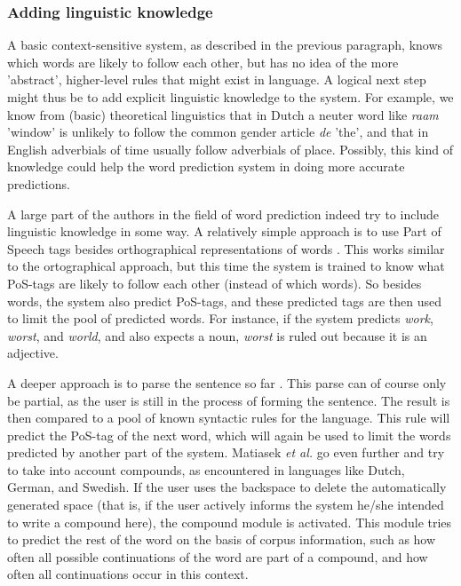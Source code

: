 \documentclass[11pt]{article}
\begin{document}
\subsubsection{Adding linguistic knowledge} \label{linguistic_knowledge}
A basic context-sensitive system, as described in the previous paragraph, knows which words are likely to follow each other, but has no idea of the more 'abstract', higher-level rules that might exist in language. A logical next step might thus be to add explicit linguistic knowledge to the system. For example, we know from (basic) theoretical linguistics that in Dutch a neuter word like \emph{raam} 'window' is unlikely to follow the common gender article \emph{de} 'the', and that in English adverbials of time usually follow adverbials of place. Possibly, this kind of knowledge could help the word prediction system in doing more accurate predictions.

A large part of the authors in the field of word prediction indeed try to include linguistic knowledge in some way. A relatively simple approach is to use Part of Speech tags besides orthographical representations of words \cite{carlberger+97,Fazly+03,copestake97}. This works similar to the ortographical approach, but this time the system is trained to know what PoS-tags are likely to follow each other (instead of which words). So besides words, the system also predict PoS-tags, and these predicted tags are then used to limit the pool of predicted words. For instance, if the system predicts \emph{work}, \emph{worst}, and \emph{world}, and also expects a noun, \emph{worst} is ruled out because it is an adjective.

A deeper approach is to parse the sentence so far \cite{Matiasek+02,garay-vitoria+97}. This parse can of course only be partial, as the user is still in the process of forming the sentence. The result is then compared to a pool of known syntactic rules for the language. This rule will predict the PoS-tag of the next word, which will again be used to limit the words predicted by another part of the system. Matiasek {\em et al.}  go even further and try to take into account compounds, as encountered in languages like Dutch, German, and Swedish. If the user uses the backspace to delete the automatically generated space (that is, if the user actively informs the system he/she intended to write a compound here), the compound module is activated. This module tries to predict the rest of the word on the basis of corpus information, such as how often all possible continuations of the word are part of a compound, and how often all continuations occur in this context.
\end{document}
